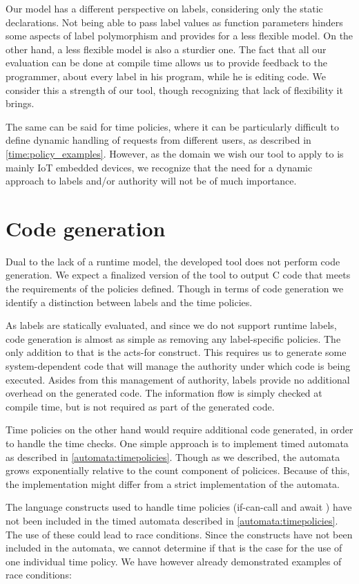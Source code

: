 Our model has a different perspective on labels, considering only the static declarations.
Not being able to pass label values as function parameters hinders some aspects of label polymorphism and provides for a less flexible model.
On the other hand, a less flexible model is also a sturdier one.
The fact that all our evaluation can be done at compile time allows us to provide feedback to the programmer, about every label in his program, while he is editing code.
We consider this a strength of our tool, though recognizing that lack of flexibility it brings.

The same can be said for time policies, where it can be particularly difficult to define dynamic handling of requests from different users, as described in \cref{time:policy_examples}.
However, as the domain we wish our tool to apply to is mainly IoT embedded devices, we recognize that the need for a dynamic approach to labels and/or authority will not be of much importance.

\section{Code generation}
Dual to the lack of a runtime model, the developed tool does not perform code generation.
We expect a finalized version of the tool to output C code that meets the requirements of the policies defined.
Though in terms of code generation we identify a distinction between labels and the time policies.

As labels are statically evaluated, and since we do not support runtime labels, code generation is almost as simple as removing any label-specific policies.
The only addition to that is the acts-for construct.
This requires us to generate some system-dependent code that will manage the authority under which code is being executed.
Asides from this management of authority, labels provide no additional overhead on the generated code.
The information flow is simply checked at compile time, but is not required as part of the generated code.

Time policies on the other hand would require additional code generated, in order to handle the time checks.
One simple approach is to implement timed automata as described in \cref{automata:timepolicies}.
Though as we described, the automata grows exponentially relative to the count component of policices.
Because of this, the implementation might differ from a strict implementation of the automata.

The language constructs used to handle time policies (if-can-call  and await ) have not been included in the timed automata described in \cref{automata:timepolicies}.
The use of these could lead to race conditions.
Since the constructs have not been included in the automata, we cannot determine if that is the case for the use of one individual time policy.
We have however already demonstrated examples of race conditions:

